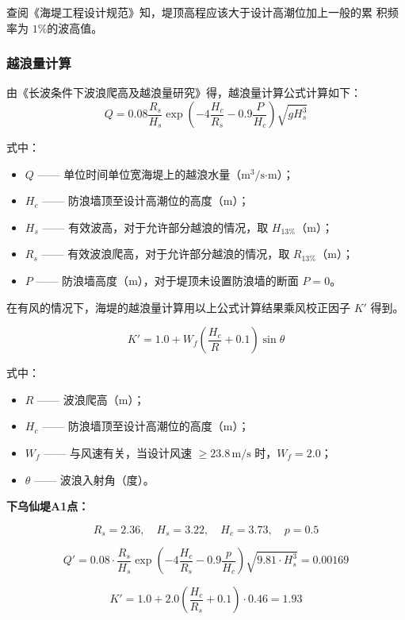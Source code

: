 \documentclass[UTF8, a4paper, 12pt]{ctexart} %
\begin{document}
查阅《海堤工程设计规范》知，堤顶高程应该大于设计高潮位加上一般的累
积频率为 $1\%$的波高值。
\subsubsection{越浪量计算}
由《长波条件下波浪爬高及越浪量研究》得，越浪量计算公式计算如下：
\begin{equation}
    Q = 0.08 \frac{R_s}{H_s} \exp\left(-4 \frac{H_c}{R_s} - 0.9 \frac{P}{H_c}\right) \sqrt{g H_s^3}
\end{equation}

式中：
\begin{itemize}
    \item $Q$ —— 单位时间单位宽海堤上的越浪水量（$\text{m}^3/\text{s·m}$）；
    \item $H_c$ —— 防浪墙顶至设计高潮位的高度（$\text{m}$）；
    \item $H_s$ —— 有效波高，对于允许部分越浪的情况，取 $H_{13\%}$（$\text{m}$）；
    \item $R_s$ —— 有效波浪爬高，对于允许部分越浪的情况，取 $R_{13\%}$（$\text{m}$）；
    \item $P$ —— 防浪墙高度（$\text{m}$），对于堤顶未设置防浪墙的断面 $P = 0$。
\end{itemize}

在有风的情况下，海堤的越浪量计算用以上公式计算结果乘风校正因子 $K'$ 得到。

\begin{equation}
    K' = 1.0 + W_f \left( \frac{H_c}{R} + 0.1 \right) \sin \theta
\end{equation}

式中：
\begin{itemize}
    \item $R$ —— 波浪爬高（$\text{m}$）；
    \item $H_c$ —— 防浪墙顶至设计高潮位的高度（$\text{m}$）；
    \item $W_f$ —— 与风速有关，当设计风速 $\geq 23.8\,\text{m/s}$ 时，$W_f = 2.0$；
    \item $\theta$ —— 波浪入射角（度）。
\end{itemize}


\textbf{下乌仙堤A1点：}

\[
R_s = 2.36, \quad H_s = 3.22, \quad H_c = 3.73, \quad p = 0.5
\]

\[
Q' = 0.08 \cdot \frac{R_s}{H_s} \exp\left(-4 \frac{H_c}{R_s} - 0.9 \frac{p}{H_c}\right) \sqrt{9.81 \cdot H_s^3} = 0.00169
\]

\[
K' = 1.0 + 2.0 \left(\frac{H_c}{R_s} + 0.1\right) \cdot 0.46 = 1.93
\]
\end{document}
